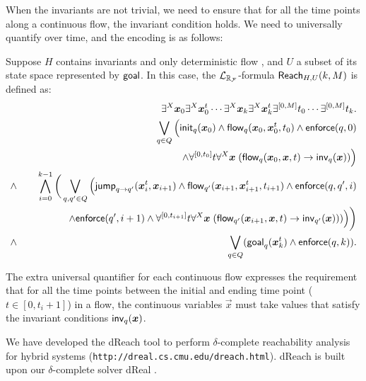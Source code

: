 When the invariants are not trivial, we need to ensure that for all the time points along a continuous flow, the invariant condition holds. We need to universally quantify over time, and the encoding is as follows:
\begin{definition}\label{br2}
Suppose $H$ contains invariants and only deterministic flow
, and $U$ a subset of its state space represented by $\mathsf{goal}$. In this case, the $\mathcal{L}_{\mathbb{R}_{\mathcal{F}}}$-formula $\mathsf{Reach}_{H,U}(k,M)$ is defined as:
\begin{eqnarray*}
& &\exists^X \vec x_{0} \exists^X\vec x_{0}^t\cdots \exists^X \vec x_{k}\exists^X\vec x_{k}^t \exists^{[0,M]}t_0\cdots \exists^{[0,M]}t_k.\\
& &\bigvee_{q\in Q} \Big(\init_{q}(\vec x_{0})\wedge \flow_{q}(\vec x_{0}, \vec x_{0}^t, t_0)\wedge \enforce(q,0)\\
& &\hspace{5cm} \wedge \forall^{[0,t_0]}t\forall^X\vec x\;(\flow_{q}(\vec x_{0}, \vec x, t)\rightarrow \inv_{q}(\vec x))\Big) \\
\wedge & &\bigwedge_{i=0}^{k-1}\bigg( \bigvee_{q, q'\in Q} \Big(\jump_{q\rightarrow q'}(\vec
x_{i}^t, \vec x_{i+1})\wedge \flow_{q'}(\vec x_{i+1}, \vec x_{i+1}^t, t_{i+1})\wedge \enforce(q,q',i)\\
& & \hspace{1.5cm}\wedge\enforce(q',i+1)\wedge \forall^{[0,t_{i+1}]}t\forall^X\vec x\;(\flow_{q'}(\vec x_{i+1}, \vec x,
t)\rightarrow \inv_{q'}(\vec x)) )\Big)\bigg)\\
\wedge & &\bigvee_{q\in Q} (\goal_q(\vec x_{k}^t)\wedge \enforce(q,k)).
\end{eqnarray*}
\end{definition}
The extra universal quantifier for each continuous flow expresses the requirement that for all the time points between the initial and ending time point ($t\in[0,t_i+1]$) in a flow, the continuous variables $\vec x$ must take values that satisfy the invariant conditions $\inv_q(\vec x)$.

We have developed the dReach tool to perform $\delta$-complete reachability analysis for 
hybrid systems (\verb#http://dreal.cs.cmu.edu/dreach.html#). dReach is built upon our $\delta$-complete 
solver dReal \citep{dreal}.
